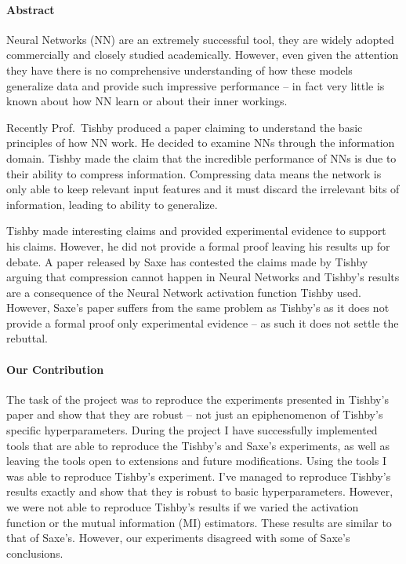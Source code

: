 \documentclass[dissertation.tex]{subfiles}
\begin{document}
\paragraph{Abstract}
Neural Networks (NN) are an extremely successful tool, they are widely adopted
commercially and closely studied academically. However, even given the attention
they have there is no comprehensive understanding of how these models generalize
data and provide such impressive performance -- in fact very little is known
about how NN learn or about their inner workings. 

Recently Prof.\ Tishby produced a paper\cite{TISHBY} claiming to understand the
basic principles of how NN work. He decided to examine NNs through the
information domain. Tishby made the claim that the incredible performance of NNs
is due to their ability to compress information. Compressing data means the
network is only able to keep relevant input features and it must discard the
irrelevant bits of information, leading to ability to generalize. 

Tishby made interesting claims and provided experimental evidence to support his
claims. However, he did not provide a formal proof leaving his results up for
debate. A paper released by Saxe \cite{SAXE} has contested the claims made by
Tishby arguing that compression cannot happen in Neural Networks and Tishby's
results are a consequence of the Neural Network activation function Tishby used.
However, Saxe's paper suffers from the same problem as Tishby's as it does not
provide a formal proof only experimental evidence -- as such it does not settle
the rebuttal.

\paragraph{Our Contribution}
The task of the project was to reproduce the experiments presented in Tishby's
paper and show that they are robust -- not just an epiphenomenon of Tishby's
specific hyperparameters. During the project I have successfully implemented
tools that are able to reproduce the Tishby's and Saxe's experiments, as well as
leaving the tools open to extensions and future modifications. Using the tools I
was able to reproduce Tishby's experiment. I've managed to reproduce Tishby's
results exactly and show that they is robust to basic hyperparameters. However,
we were not able to reproduce Tishby's results if we varied the activation
function or the mutual information (MI) estimators. These results are similar to
that of Saxe's. However, our experiments disagreed with some of Saxe's
conclusions.
\end{document}
